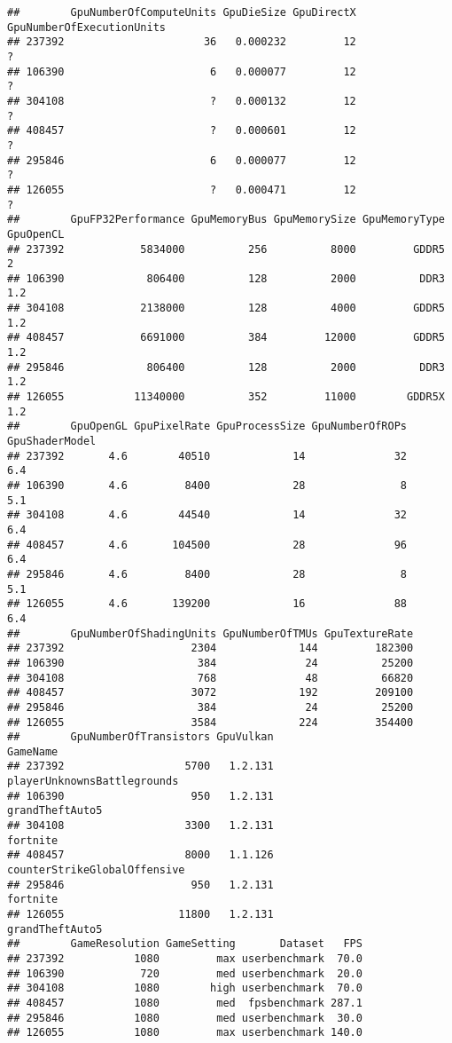 \documentclass[
]{article}
\begin{document}
\begin{verbatim}
##        GpuNumberOfComputeUnits GpuDieSize GpuDirectX GpuNumberOfExecutionUnits
## 237392                      36   0.000232         12                         ?
## 106390                       6   0.000077         12                         ?
## 304108                       ?   0.000132         12                         ?
## 408457                       ?   0.000601         12                         ?
## 295846                       6   0.000077         12                         ?
## 126055                       ?   0.000471         12                         ?
##        GpuFP32Performance GpuMemoryBus GpuMemorySize GpuMemoryType GpuOpenCL
## 237392            5834000          256          8000         GDDR5         2
## 106390             806400          128          2000          DDR3       1.2
## 304108            2138000          128          4000         GDDR5       1.2
## 408457            6691000          384         12000         GDDR5       1.2
## 295846             806400          128          2000          DDR3       1.2
## 126055           11340000          352         11000        GDDR5X       1.2
##        GpuOpenGL GpuPixelRate GpuProcessSize GpuNumberOfROPs GpuShaderModel
## 237392       4.6        40510             14              32            6.4
## 106390       4.6         8400             28               8            5.1
## 304108       4.6        44540             14              32            6.4
## 408457       4.6       104500             28              96            6.4
## 295846       4.6         8400             28               8            5.1
## 126055       4.6       139200             16              88            6.4
##        GpuNumberOfShadingUnits GpuNumberOfTMUs GpuTextureRate
## 237392                    2304             144         182300
## 106390                     384              24          25200
## 304108                     768              48          66820
## 408457                    3072             192         209100
## 295846                     384              24          25200
## 126055                    3584             224         354400
##        GpuNumberOfTransistors GpuVulkan                     GameName
## 237392                   5700   1.2.131  playerUnknownsBattlegrounds
## 106390                    950   1.2.131              grandTheftAuto5
## 304108                   3300   1.2.131                     fortnite
## 408457                   8000   1.1.126 counterStrikeGlobalOffensive
## 295846                    950   1.2.131                     fortnite
## 126055                  11800   1.2.131              grandTheftAuto5
##        GameResolution GameSetting       Dataset   FPS
## 237392           1080         max userbenchmark  70.0
## 106390            720         med userbenchmark  20.0
## 304108           1080        high userbenchmark  70.0
## 408457           1080         med  fpsbenchmark 287.1
## 295846           1080         med userbenchmark  30.0
## 126055           1080         max userbenchmark 140.0
\end{verbatim}
\end{document}
